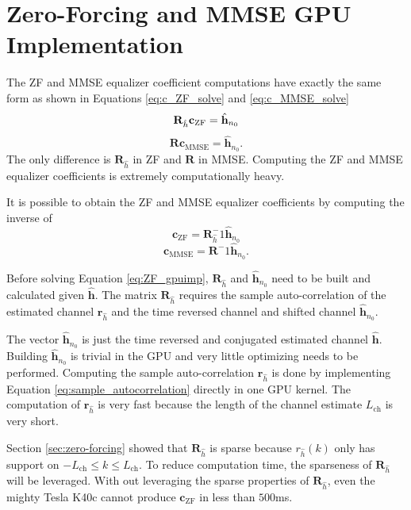 \section{Zero-Forcing and MMSE GPU Implementation}
The ZF and MMSE equalizer coefficient computations have exactly the same form as shown in Equations \eqref{eq:c_ZF_solve} and \eqref{eq:c_MMSE_solve}
\begin{equation}
\mathbf{R}_{\hat{h}} \mathbf{c}_\text{ZF} = \hat{\mathbf{h}}_{n_0}\\
\label{eq:ZF_gpuimp_solve}
\end{equation}
\begin{equation}
\mathbf{R} \mathbf{c}_\text{MMSE} = \hat{\mathbf{h}}_{n_0}.
\label{eq:MMSE_gpuimp_solve}
\end{equation}
The only difference is $\mathbf{R}_{\hat{h}}$ in ZF and $\mathbf{R}$ in MMSE.
Computing the ZF and MMSE equalizer coefficients is extremely computationally heavy.

It is possible to obtain the ZF and MMSE equalizer coefficients by computing the inverse of 
\begin{equation}
 \mathbf{c}_\text{ZF} = \mathbf{R}_{\hat{h}}^-1\hat{\mathbf{h}}_{n_0}
\label{eq:ZF_gpuimp}
\end{equation}
\begin{equation}
 \mathbf{c}_\text{MMSE} = \mathbf{R}^-1 \hat{\mathbf{h}}_{n_0}.
\label{eq:MMSE_gpuimp}
\end{equation}

Before solving Equation \eqref{eq:ZF_gpuimp}, $\mathbf{R}_{\hat{h}}$ and $\hat{\mathbf{h}}_{n_0}$ need to be built and calculated given $\hat{\mathbf{h}}$.
The matrix $\mathbf{R}_{\hat{h}}$ requires the sample auto-correlation of the estimated channel $\mathbf{r}_{\hat{h}}$ and the time reversed channel and shifted channel $\hat{\mathbf{h}}_{n_0}$.

The vector $\hat{\mathbf{h}}_{n_0}$ is just the time reversed and conjugated estimated channel $\hat{\mathbf{h}}$. Building $\hat{\mathbf{h}}_{n_0}$ is trivial in the GPU and very little optimizing needs to be performed.
Computing the sample auto-correlation $\mathbf{r}_{\hat{h}}$ is done by implementing Equation \eqref{eq:sample_autocorrelation} directly in one GPU kernel.
The computation of $\mathbf{r}_{\hat{h}}$ is very fast because the length of the channel estimate $L_{\text{ch}}$ is very short.

Section \ref{sec:zero-forcing} showed that $\mathbf{R}_{\hat{h}}$ is sparse because $r_{\hat{h}}(k)$ only has support on $-L_{\text{ch}} \leq k \leq L_{\text{ch}}$. 
To reduce computation time, the sparseness of $\mathbf{R}_{\hat{h}}$ will be leveraged. 
With out leveraging the sparse properties of $\mathbf{R}_{\hat{h}}$, even the mighty Tesla K40c cannot produce $\mathbf{c}_\text{ZF}$ in less than $500$ms.

